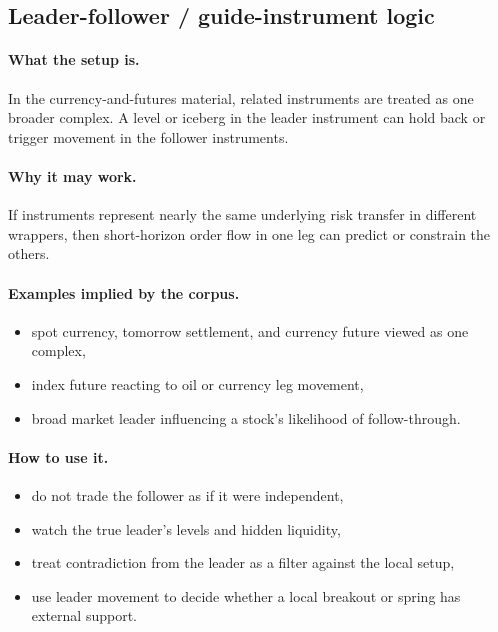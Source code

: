 \subsection{Leader-follower / guide-instrument logic}

\paragraph{What the setup is.} In the currency-and-futures material, related instruments are treated as one broader complex. A level or iceberg in the leader instrument can hold back or trigger movement in the follower instruments.

\paragraph{Why it may work.} If instruments represent nearly the same underlying risk transfer in different wrappers, then short-horizon order flow in one leg can predict or constrain the others.

\paragraph{Examples implied by the corpus.}
\begin{itemize}
\item spot currency, tomorrow settlement, and currency future viewed as one complex,
\item index future reacting to oil or currency leg movement,
\item broad market leader influencing a stock's likelihood of follow-through.
\end{itemize}

\paragraph{How to use it.}
\begin{itemize}
\item do not trade the follower as if it were independent,
\item watch the true leader's levels and hidden liquidity,
\item treat contradiction from the leader as a filter against the local setup,
\item use leader movement to decide whether a local breakout or spring has external support.
\end{itemize}


